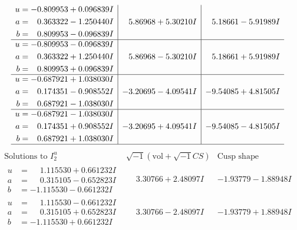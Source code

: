 \documentclass[1p]{elsarticle_modified}
\theoremstyle{definition}
\newcommand{\I}{\sqrt{-1}}
\begin{document}
$$\begin{array}{c|c|c}
\begin{aligned}
u &= -0.809953 + 0.096839 I \\
a &= \phantom{-}0.363322 - 1.250440 I \\
b &= \phantom{-}0.809953 - 0.096839 I\end{aligned}
 & \phantom{-}5.86968 + 5.30210 I & \phantom{-}5.18661 - 5.91989 I \\ \hline\begin{aligned}
u &= -0.809953 - 0.096839 I \\
a &= \phantom{-}0.363322 + 1.250440 I \\
b &= \phantom{-}0.809953 + 0.096839 I\end{aligned}
 & \phantom{-}5.86968 - 5.30210 I & \phantom{-}5.18661 + 5.91989 I \\ \hline\begin{aligned}
u &= -0.687921 + 1.038030 I \\
a &= \phantom{-}0.174351 - 0.908552 I \\
b &= \phantom{-}0.687921 - 1.038030 I\end{aligned}
 & -3.20695 - 4.09541 I & -9.54085 + 4.81505 I \\ \hline\begin{aligned}
u &= -0.687921 - 1.038030 I \\
a &= \phantom{-}0.174351 + 0.908552 I \\
b &= \phantom{-}0.687921 + 1.038030 I\end{aligned}
 & -3.20695 + 4.09541 I & -9.54085 - 4.81505 I\\
 \hline 
 \end{array}$$\newpage$$\begin{array}{c|c|c}  
\text{Solutions to }I^u_{2}& \I (\text{vol} + \sqrt{-1}CS) & \text{Cusp shape}\\
 \hline 
\begin{aligned}
u &= \phantom{-}1.115530 + 0.661232 I \\
a &= \phantom{-}0.315105 - 0.652823 I \\
b &= -1.115530 - 0.661232 I\end{aligned}
 & \phantom{-}3.30766 + 2.48097 I & -1.93779 - 1.88948 I \\ \hline\begin{aligned}
u &= \phantom{-}1.115530 - 0.661232 I \\
a &= \phantom{-}0.315105 + 0.652823 I \\
b &= -1.115530 + 0.661232 I\end{aligned}
 & \phantom{-}3.30766 - 2.48097 I & -1.93779 + 1.88948 I \\ \hline\begin{aligned}

\end{aligned}
\end{array}$$
\end{document}
